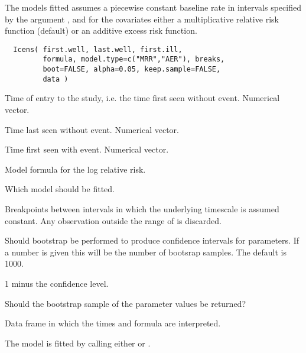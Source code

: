 \begin{Description}\relax
The models fitted assumes a piecewise constant baseline rate in
intervals specified by the argument , and for the
covariates either a multiplicative relative risk function (default) or
an additive excess risk function.
\end{Description}
\begin{Usage}
\begin{verbatim}
  Icens( first.well, last.well, first.ill,
         formula, model.type=c("MRR","AER"), breaks,
         boot=FALSE, alpha=0.05, keep.sample=FALSE,
         data )
  \end{verbatim}
\end{Usage}
\begin{Arguments}
\begin{ldescription}
\item[\code{first.well}] Time of entry to the study, i.e. the time first seen
without event. Numerical vector.
\item[\code{last.well}] Time last seen without event. Numerical vector.
\item[\code{first.ill}] Time first seen with event. Numerical vector.
\item[\code{formula}] Model formula for the log relative risk.
\item[\code{model.type}] Which model should be fitted.
\item[\code{breaks}] Breakpoints between intervals in which the underlying
timescale is assumed constant. Any observation outside the range of
 is discarded.
\item[\code{boot}] Should bootstrap be performed to produce confidence
intervals for parameters. If a number is given this will be the
number of bootsrap samples. The default is 1000.
\item[\code{alpha}] 1 minus the confidence level.
\item[\code{keep.sample}] Should the bootstrap sample of the parameter values
be returned?
\item[\code{data}] Data frame in which the times and formula are interpreted.
\end{ldescription}
\end{Arguments}
\begin{Details}\relax
The model is fitted by calling either  or
.
\end{Details}
